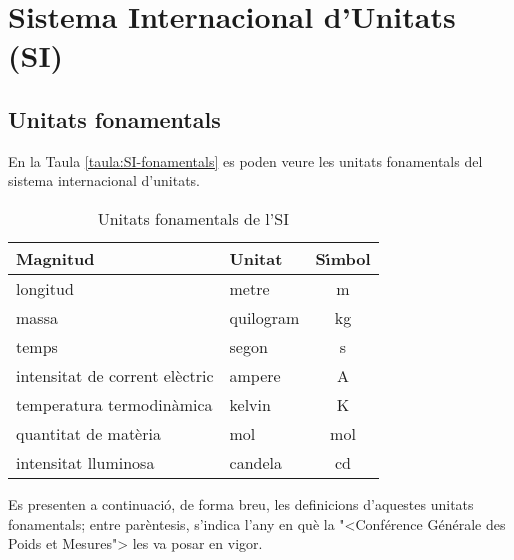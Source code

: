 \chapter{Sistema Internacional d'Unitats (SI)} 

\section{Unitats fonamentals}

En la Taula \vref{taula:SI-fonamentals} es poden veure les unitats
fonamentals del sistema internacional d'unitats.

\begin{table}[h]
   \caption{\label{taula:SI-fonamentals} Unitats fonamentals de l'SI}
   \begin{center}\begin{tabular}{llc}
   \toprule[1pt]
   Magnitud & Unitat & S\'{\i}mbol \\
   \midrule
   longitud & metre & m \\
   massa & quilogram & kg \\
   temps & segon & s\\
   intensitat de corrent el\`{e}ctric & ampere & A \\
   temperatura termodin\`{a}mica & kelvin & K\\
   quantitat de mat\`{e}ria & mol & mol \\
   intensitat lluminosa & candela &  cd \\
   \bottomrule[1pt]
   \end{tabular} \end{center}
\end{table}
   
   
  
 
   
  

Es presenten a continuaci\'{o}, de forma breu, les definicions
d'aquestes unitats fonamentals; entre par\`{e}ntesis, s'indica l'any en
qu\`{e} la {"<}Conf\'{e}rence G\'{e}n\'{e}rale des Poids et Mesures{">} les va posar en
vigor.

